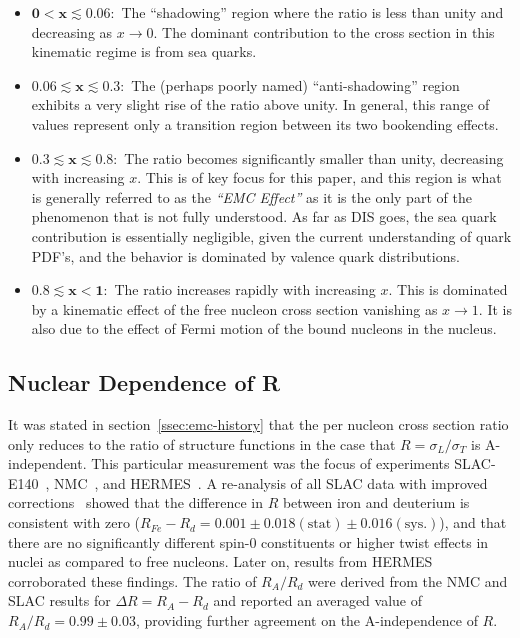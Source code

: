 \begin{itemize}
	\item $\mathbf{0<x\lesssim0.06:}$ The ``shadowing'' region where the ratio is less than unity and decreasing as $x\rightarrow0$. The dominant contribution to the cross section in this kinematic regime is from sea quarks.
	\item $\mathbf{0.06\lesssim x \lesssim 0.3:}$ The (perhaps poorly named) ``anti-shadowing'' region exhibits a very slight rise of the ratio above unity. In general, this range of values represent only a transition region between its two bookending effects.
	\item $\mathbf{0.3\lesssim x \lesssim 0.8:}$ The ratio becomes significantly smaller than unity, decreasing with increasing $x$. This is of key focus for this paper, and this region is what is generally referred to as the \emph{``EMC Effect''}\cite{Geesaman:1995yd} as it is the only part of the phenomenon that is not fully understood.  As far as DIS goes, the sea quark contribution is essentially negligible, given the current understanding of quark PDF's, and the behavior is dominated by valence quark distributions.
	\item $\mathbf{0.8\lesssim x < 1:}$ The ratio increases rapidly with increasing $x$. This is dominated by a kinematic effect of the free nucleon cross section vanishing as $x\rightarrow1$. It is also due to the effect of Fermi motion of the bound nucleons in the nucleus.
\end{itemize}

\subsection{Nuclear Dependence of R}

It was stated in section~\ref{ssec:emc-history} that the per nucleon cross section ratio only reduces to the ratio of structure functions in the case that $R=\sigma_L/\sigma_T$ is A-independent. This particular measurement was the focus of experiments SLAC-E140~\cite{PhysRevLett.61.1061, Dasu:1993vk}, NMC~\cite{Arneodo:1996qe}, and HERMES~\cite{Ackerstaff:1999ac}. A re-analysis of all SLAC data with improved corrections~\cite{Dasu:1993vk} showed that the difference in $R$ between iron and deuterium is consistent with zero ($R_{Fe}-R_d = 0.001 \pm 0.018 (\text{stat}) \pm 0.016 (\text{sys.})$), and that there are no significantly different spin-0 constituents or higher twist effects in nuclei as compared to free nucleons. Later on, results from HERMES corroborated these findings. The ratio of $R_A/R_d$ were derived from the NMC and SLAC results for $\Delta R = R_A - R_d$ and reported an averaged value of $R_A/R_d = 0.99 \pm 0.03$, providing further agreement on the A-independence of $R$.

